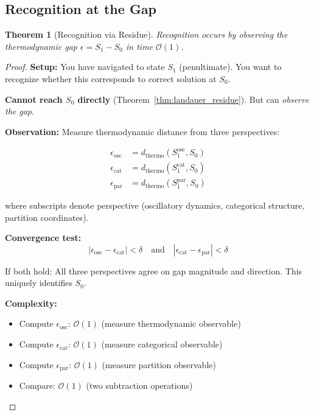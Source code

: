 \documentclass[twocolumn,10pt]{article}
\newtheorem{theorem}{Theorem}[section]
\theoremstyle{definition}
\theoremstyle{remark}
\newcommand{\bigO}{\mathcal{O}}
\begin{document}
\subsection{Recognition at the Gap}

\begin{theorem}[Recognition via Residue]
\label{thm:recognition_residue}
Recognition occurs by observing the thermodynamic gap $\epsilon = S_1 - S_0$ in time $\bigO(1)$.
\end{theorem}

\begin{proof}
\textbf{Setup:} You have navigated to state $S_1$ (penultimate). You want to recognize whether this corresponds to correct solution at $S_0$.

\vspace{0.2cm}
\noindent\textbf{Cannot reach $S_0$ directly} (Theorem~\ref{thm:landauer_residue}). But can \textit{observe the gap}.

\vspace{0.2cm}
\noindent\textbf{Observation:} Measure thermodynamic distance from three perspectives:

\begin{align}
\epsilon_{\text{osc}} &= d_{\text{thermo}}(S_1^{\text{osc}}, S_0) \\
\epsilon_{\text{cat}} &= d_{\text{thermo}}(S_1^{\text{cat}}, S_0) \\
\epsilon_{\text{par}} &= d_{\text{thermo}}(S_1^{\text{par}}, S_0)
\end{align}

where subscripts denote perspective (oscillatory dynamics, categorical structure, partition coordinates).

\vspace{0.2cm}
\noindent\textbf{Convergence test:}
\begin{equation}
|\epsilon_{\text{osc}} - \epsilon_{\text{cat}}| < \delta \quad \text{and} \quad |\epsilon_{\text{cat}} - \epsilon_{\text{par}}| < \delta
\end{equation}

If both hold: All three perspectives agree on gap magnitude and direction. This uniquely identifies $S_0$.

\vspace{0.2cm}
\noindent\textbf{Complexity:}
\begin{itemize}
\item Compute $\epsilon_{\text{osc}}$: $\bigO(1)$ (measure thermodynamic observable)
\item Compute $\epsilon_{\text{cat}}$: $\bigO(1)$ (measure categorical observable)
\item Compute $\epsilon_{\text{par}}$: $\bigO(1)$ (measure partition observable)
\item Compare: $\bigO(1)$ (two subtraction operations)
\end{itemize}


\end{proof}
\end{document}
